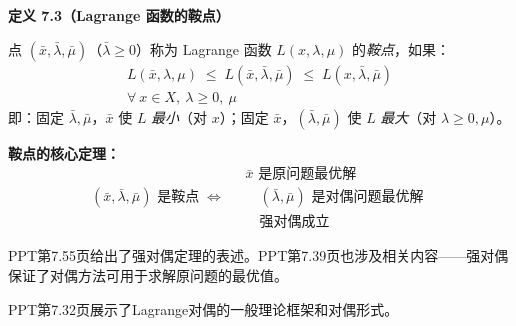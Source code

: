 \begin{defbox}
\textbf{定义 7.3（Lagrange 函数的鞍点）}

点 $(\bar{x}, \bar{\lambda}, \bar{\mu})$（$\bar{\lambda}\ge0$）称为 Lagrange 函数 $L(x,\lambda,\mu)$ 的\emph{鞍点}，如果：
\begin{align*}
L(\bar{x},\lambda,\mu) \;\le\; L(\bar{x},\bar{\lambda},\bar{\mu})
\;\le\; L(x,\bar{\lambda},\bar{\mu}) \\[-2pt]
\forall\ x\in X,\ \lambda\ge0,\ \mu
\end{align*}
即：固定 $\bar{\lambda},\bar{\mu}$，$\bar{x}$ 使 $L$ \emph{最小}（对 $x$）；固定 $\bar{x}$，$(\bar{\lambda},\bar{\mu})$ 使 $L$ \emph{最大}（对 $\lambda\ge0,\mu$）。
\end{defbox}


\textbf{鞍点的核心定理：}
\[
(\bar{x},\bar{\lambda},\bar{\mu}) \text{ 是鞍点}
\;\Longleftrightarrow\;
\begin{aligned}
&\bar{x} \text{ 是原问题最优解} \\
&\quad (\bar{\lambda},\bar{\mu}) \text{ 是对偶问题最优解} \\
&\quad \text{强对偶成立}
\end{aligned}
\]

\medskip
PPT第7.55页给出了强对偶定理的表述。PPT第7.39页也涉及相关内容——强对偶保证了对偶方法可用于求解原问题的最优值。

\medskip
{}
\medskip


\medskip
PPT第7.32页展示了Lagrange对偶的一般理论框架和对偶形式。

\medskip
{}
\medskip


